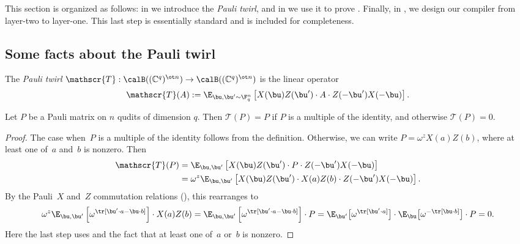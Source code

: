 \documentclass[11pt]{article}
\newcommand{\twirl}{\mathscr{T}}
\begin{document}
This section is organized as follows:
in  we introduce the \emph{Pauli twirl},
and in  we use it to prove .
Finally, in , we design our compiler from layer-two to layer-one.
This last step is essentially standard and is included for completeness.

\subsection{Some facts about the Pauli twirl}\label{sec:pauli-twirl}

\newcommand{\push}{\nu}
\newcommand{\bpush}{\bnu}
\newcommand{\twirlset}{S_{\mathrm{twirl}}}
\newcommand{\twirldist}{\calD_{\mathrm{twirl}}}

\begin{definition}
  The \emph{Pauli twirl} $\twirl: \calB((\mathbb{C}^q)^{\ot n})
  \to \calB((\mathbb{C}^q)^{\ot n})$ is the linear operator
  \[ \twirl(A) := \E_{\bu, \bu' \sim \F_q^n}\left[
      X(\bu) Z(\bu') \cdot A \cdot Z(-\bu') X(-\bu) \right]. \]
\end{definition}

\begin{proposition}\label{claim:twirled_pauli}
  Let $P$ be a Pauli matrix on $n$ qudits of dimension $q$. Then
$
\twirl(P) =  P
$
if $P$ is a multiple of the identity,
and otherwise $\twirl(P) = 0$.
\end{proposition}

\begin{proof}
The case when~$P$ is a multiple of the identity follows from the definition.
Otherwise, we can write $P = \omega^z X(a) Z(b)$, where at least one of~$a$ and~$b$ is nonzero. Then
\begin{align*}
     \twirl(P)
&=  \E_{\bu, \bu'} \left[ X(\bu) Z(\bu') \cdot P \cdot
		Z(-\bu') X(-\bu) \right]  \\
&= \omega^z \E_{\bu, \bu'} \left[ X(\bu) Z(\bu') \cdot X(a) Z(b) \cdot
		Z(-\bu') X(-\bu) \right].
\end{align*}
By the Pauli~$X$ and~$Z$ commutation relations (),
this rearranges to
\begin{equation*}
 \omega^z \E_{\bu, \bu'} \left[\omega^{\tr[\bu' \cdot a - \bu \cdot b]}\right] \cdot X(a) Z(b)
=  \E_{\bu, \bu'} \left[ \omega^{\tr[\bu' \cdot a - \bu \cdot b]} \right] \cdot P
    =  \E_{\bu'} \big[ \omega^{\tr[\bu' \cdot a]}\big] \cdot \E_{\bu}\big[\omega^{- \tr[\bu \cdot b]} \big] \cdot P
    = 0.
\end{equation*}
Here the last step uses  and the fact that at least one of~$a$ or~$b$ is nonzero.
\end{proof}
\end{document}
